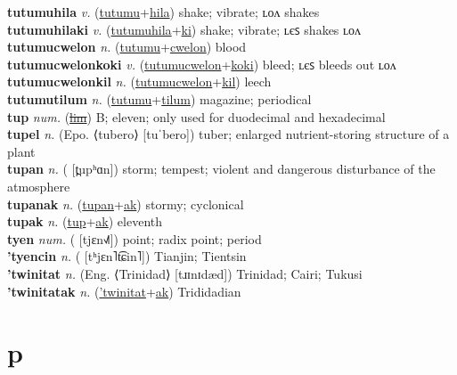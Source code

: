 \textbf{tutumuhila} \textit{v.} (\hyperref[tutumu]{tutumu}+\hyperref[hila]{hila})
shake; vibrate; ʟᴏᴧ shakes \label{tutumuhila} \\
\textbf{tutumuhilaki} \textit{v.} (\hyperref[tutumuhila]{tutumuhila}+\hyperref[ki]{ki})
shake; vibrate; ʟєꜱ shakes ʟᴏᴧ \label{tutumuhilaki} \\
\textbf{tutumucwelon} \textit{n.} (\hyperref[tutumu]{tutumu}+\hyperref[cwelon]{cwelon})
blood \label{tutumucwelon} \\
\textbf{tutumucwelonkoki} \textit{v.} (\hyperref[tutumucwelon]{tutumucwelon}+\hyperref[koki]{koki})
bleed; ʟєꜱ bleeds out ʟᴏᴧ \label{tutumucwelonkoki} \\
\textbf{tutumucwelonkil} \textit{n.} (\hyperref[tutumucwelon]{tutumucwelon}+\hyperref[kil]{kil})
leech \label{tutumucwelonkil} \\
\textbf{tutumutilum} \textit{n.} (\hyperref[tutumu]{tutumu}+\hyperref[tilum]{tilum})
magazine; periodical \label{tutumutilum} \\
\textbf{tup} \textit{num.} (\hyperref[lim]{\sout{lim}})
B; eleven; only used for duodecimal and hexadecimal \label{tup} \\
\textbf{tupel} \textit{n.} (Epo. ⟨tubero⟩ [tuˈbero])
tuber; enlarged nutrient-storing structure of a plant \label{tupel} \\
\textbf{tupan} \textit{n.} ( [t̪upʰɑn])
storm; tempest; violent and dangerous disturbance of the atmosphere \label{tupan} \\
\textbf{tupanak} \textit{n.} (\hyperref[tupan]{tupan}+\hyperref[ak]{ak})
stormy; cyclonical \label{tupanak} \\
\textbf{tupak} \textit{n.} (\hyperref[tup]{tup}+\hyperref[ak]{ak})
eleventh \label{tupak} \\
\textbf{tyen} \textit{num.} ( [tjɛn˧˩˥])
point; radix point; period \label{tyen} \\
\textbf{'tyencin} \textit{n.} ( [tʰjɛn˥t͡ɕin˥])
Tianjin; Tientsin \label{'tyencin} \\
\textbf{'twinitat} \textit{n.} (Eng. ⟨Trinidad⟩ [tɹɪnɪdæd])
Trinidad; Cairi; Tukusi \label{'twinitat} \\
\textbf{'twinitatak} \textit{n.} (\hyperref['twinitat]{'twinitat}+\hyperref[ak]{ak})
Trididadian \label{'twinitatak} 

\section{p}

